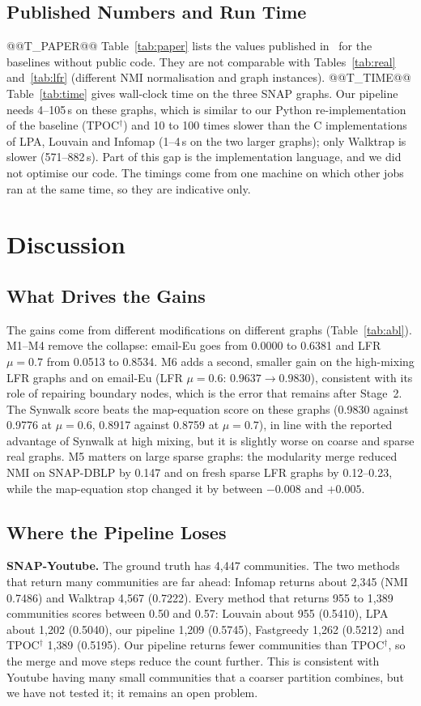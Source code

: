 \documentclass[conference]{IEEEtran}
\begin{document}
\subsection{Published Numbers and Run Time}
@@T_PAPER@@
Table~\ref{tab:paper} lists the values published in~\cite{kong2026} for the baselines without public code. They are not comparable with Tables~\ref{tab:real} and~\ref{tab:lfr} (different NMI normalisation and graph instances).
@@T_TIME@@
Table~\ref{tab:time} gives wall-clock time on the three SNAP graphs. Our pipeline needs 4--105\,s on these graphs, which is similar to our Python re-implementation of the baseline (TPOC$^{\dagger}$) and 10 to 100 times slower than the C implementations of LPA, Louvain and Infomap (1--4\,s on the two larger graphs); only Walktrap is slower (571--882\,s). Part of this gap is the implementation language, and we did not optimise our code. The timings come from one machine on which other jobs ran at the same time, so they are indicative only.

\section{Discussion}\label{sec:discussion}
\subsection{What Drives the Gains}
The gains come from different modifications on different graphs (Table~\ref{tab:abl}). M1--M4 remove the collapse: email-Eu goes from 0.0000 to 0.6381 and LFR $\mu{=}0.7$ from 0.0513 to 0.8534. M6 adds a second, smaller gain on the high-mixing LFR graphs and on email-Eu (LFR $\mu{=}0.6$: $0.9637\to0.9830$), consistent with its role of repairing boundary nodes, which is the error that remains after Stage~2. The Synwalk score beats the map-equation score on these graphs (0.9830 against 0.9776 at $\mu{=}0.6$, 0.8917 against 0.8759 at $\mu{=}0.7$), in line with the reported advantage of Synwalk at high mixing, but it is slightly worse on coarse and sparse real graphs. M5 matters on large sparse graphs: the modularity merge reduced NMI on SNAP-DBLP by 0.147 and on fresh sparse LFR graphs by 0.12--0.23, while the map-equation stop changed it by between $-0.008$ and $+0.005$.

\subsection{Where the Pipeline Loses}
\textbf{SNAP-Youtube.} The ground truth has 4{,}447 communities. The two methods that return many communities are far ahead: Infomap returns about 2{,}345 (NMI 0.7486) and Walktrap 4{,}567 (0.7222). Every method that returns 955 to 1{,}389 communities scores between 0.50 and 0.57: Louvain about 955 (0.5410), LPA about 1{,}202 (0.5040), our pipeline 1{,}209 (0.5745), Fastgreedy 1{,}262 (0.5212) and TPOC$^{\dagger}$ 1{,}389 (0.5195). Our pipeline returns fewer communities than TPOC$^{\dagger}$, so the merge and move steps reduce the count further. This is consistent with Youtube having many small communities that a coarser partition combines, but we have not tested it; it remains an open problem.
\end{document}
